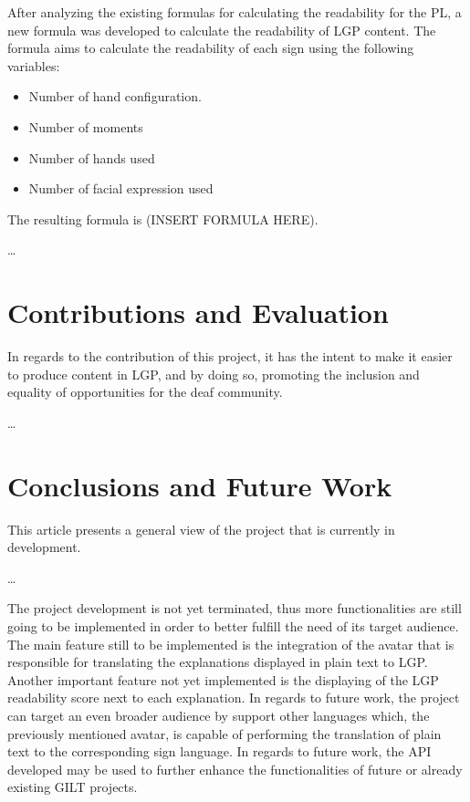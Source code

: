 \documentclass[runningheads]{llncs}
\begin{document}
After analyzing the existing formulas for calculating the readability for the PL, a new formula was developed to calculate the readability of LGP content.
The formula aims to calculate the readability of each sign using the following variables:

\begin{itemize}
    \item Number of hand configuration.
    \item Number of moments
    \item Number of hands used
    \item Number of facial expression used
\end{itemize}

The resulting formula is (INSERT FORMULA HERE).

\dots

\section{Contributions and Evaluation}

In regards to the contribution of this project, it has the intent to make it easier to produce content in LGP, and by doing so, promoting the inclusion and equality of opportunities for the deaf community.

\dots

\section{Conclusions and Future Work}

This article presents a general view of the project that is currently in development.

\dots

The project development is not yet terminated, thus more functionalities are still going to be implemented in order to better fulfill the need of its target audience.
The main feature still to be implemented is the integration of the avatar that is responsible for translating the explanations displayed in plain text to LGP.
Another important feature not yet implemented is the displaying of the LGP readability score next to each explanation.
In regards to future work, the project can target an even broader audience by support other languages which, the previously mentioned avatar, is capable of performing the translation of plain text to the corresponding sign language.
In regards to future work, the API developed may be used to further enhance the functionalities of future or already existing GILT projects.
\end{document}
